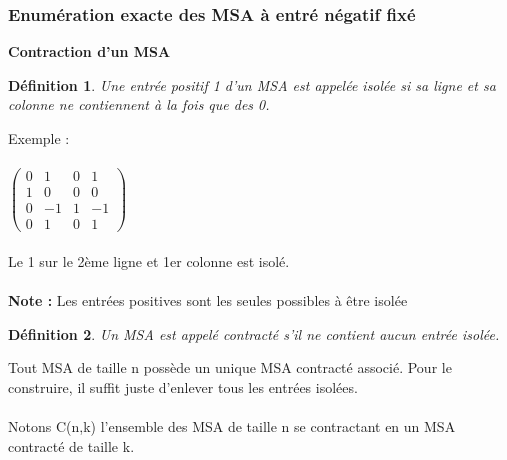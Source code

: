 \documentclass{book}
\newtheorem{petit_nom2}{Définition}[chapter]
\begin{document}
  \subsubsection{Enumération exacte des MSA à entré négatif fixé}
  \begin{large}
  \textbf{Contraction d'un MSA}
  \end{large}
  \begin{petit_nom2}
  Une entrée positif 1 d'un MSA est appelée isolée si sa ligne et sa colonne ne contiennent à la fois que des 0.
  \end{petit_nom2}
   Exemple : \\\\
  $\begin{pmatrix}
 0&1&0&1\\1&0&0&0\\0&-1&1&-1\\0&1&0&1
 \end{pmatrix} $ \\\\ Le 1 sur le 2ème ligne et 1er colonne est isolé. \\\\
 \textbf{Note :} Les entrées positives sont les seules possibles à être isolée \\
 \begin{petit_nom2}
 Un MSA est appelé contracté s'il ne contient aucun entrée isolée.
 \end{petit_nom2}
 Tout MSA de taille n possède un unique MSA contracté associé. Pour le construire, il suffit juste d'enlever tous les entrées isolées. \\ \\
 Notons C(n,k) l'ensemble des MSA de taille n se contractant en un MSA contracté de taille k. \\
\end{document}
